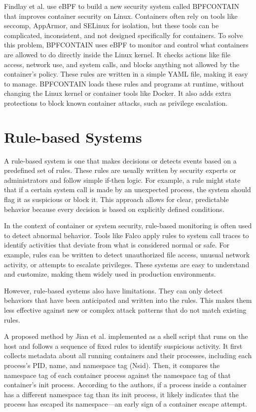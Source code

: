 \documentclass[12pt]{report}
\begin{document}
\begin{doublespace}
Findlay et al. \cite{findlay2021bpfcontain} use eBPF to build a new security system called BPFCONTAIN that improves container security on Linux. Containers often rely on tools like seccomp, AppArmor, and SELinux for isolation, but these tools can be complicated, inconsistent, and not designed specifically for containers. To solve this problem, BPFCONTAIN uses eBPF to monitor and control what containers are allowed to do directly inside the Linux kernel. It checks actions like file access, network use, and system calls, and blocks anything not allowed by the container’s policy. These rules are written in a simple YAML file, making it easy to manage. BPFCONTAIN loads these rules and programs at runtime, without changing the Linux kernel or container tools like Docker. It also adds extra protections to block known container attacks, such as privilege escalation.



\section{Rule-based Systems}

A rule-based system is one that makes decisions or detects events based on a predefined set of rules. These rules are usually written by security experts or administrators and follow simple if-then logic. For example, a rule might state that if a certain system call is made by an unexpected process, the system should flag it as suspicious or block it. This approach allows for clear, predictable behavior because every decision is based on explicitly defined conditions.

In the context of container or system security, rule-based monitoring is often used to detect abnormal behavior. Tools like Falco apply rules to system call traces to identify activities that deviate from what is considered normal or safe. For example, rules can be written to detect unauthorized file access, unusual network activity, or attempts to escalate privileges. These systems are easy to understand and customize, making them widely used in production environments.

However, rule-based systems also have limitations. They can only detect behaviors that have been anticipated and written into the rules. This makes them less effective against new or complex attack patterns that do not match existing rules.

A proposed method by Jian et al. \cite{jian2017defense} implemented as a shell script that runs on the host and follows a sequence of fixed rules to identify suspicious activity. It first collects metadata about all running containers and their processes, including each process’s PID, name, and namespace tag (Nsid). Then, it compares the namespace tag of each container process against the namespace tag of that container’s init process. According to the authors, if a process inside a container has a different namespace tag than its init process, it likely indicates that the process has escaped its namespace—an early sign of a container escape attempt.


\end{doublespace}
\end{document}
